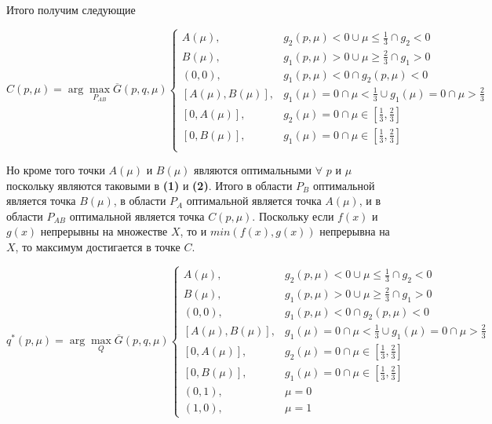 \begin{flushleft}
	Итого получим следующие 

	$C(p,\mu) = \arg \max \limits_{P_{AB}} \overline{G}(p,q,\mu)
	\begin{cases}
	A(\mu), & g_2(p,\mu)<0 \cup \mu \leqslant \frac{1}{3} \cap g_2 < 0 \\
	B(\mu), & g_1(p,\mu)>0 \cup \mu \geqslant \frac{2}{3} \cap g_1 > 0 \\
	(0,0),  & g_1(p,\mu)<0 \cap g_2(p,\mu)<0 \\
	[A(\mu), B(\mu)], 
	& g_1(\mu)=0 \cap \mu < \frac{1}{3} \cup g_1(\mu)=0 \cap \mu > \frac{2}{3} \\
	[0, A(\mu)], & g_2(\mu)=0 \cap \mu \in [\frac{1}{3},\frac{2}{3}] \\
	[0, B(\mu)], & g_1(\mu)=0 \cap \mu \in [\frac{1}{3},\frac{2}{3}] \\
	\end{cases}	
	$	
	
	Но кроме того точки $A(\mu)$ и $B(\mu)$ являются оптимальными 
	$\forall$ $p$ и $\mu$ поскольку	являются таковыми в \textbf{(1)} и \textbf{(2)}.
	Итого в области $P_B$ оптимальной является точка $B(\mu)$,
	в области $P_A$ оптимальной является точка $A(\mu)$,
	и в области $P_{AB}$ оптимальной является точка $C(p, \mu)$.
	Поскольку если $f(x)$ и $g(x)$ непрерывны на множестве $X$, то и 
	$min(f(x), g(x))$ непрерывна на $X$, то максимум достигается в точке
	$C$.
	
	$q^*(p,\mu)= \arg \max \limits_Q \overline{G}(p,q,\mu)
	\begin{cases}
	A(\mu), & g_2(p,\mu)<0 \cup \mu \leqslant \frac{1}{3} \cap g_2 < 0 \\
	B(\mu), & g_1(p,\mu)>0 \cup \mu \geqslant \frac{2}{3} \cap g_1 > 0 \\
	(0,0),  & g_1(p,\mu)<0 \cap g_2(p,\mu)<0 \\
	[A(\mu), B(\mu)], 
	& g_1(\mu)=0 \cap \mu < \frac{1}{3} \cup g_1(\mu)=0 \cap \mu > \frac{2}{3} \\
	[0, A(\mu)], & g_2(\mu)=0 \cap \mu \in [\frac{1}{3},\frac{2}{3}] \\
	[0, B(\mu)], & g_1(\mu)=0 \cap \mu \in [\frac{1}{3},\frac{2}{3}] \\
	(0,1), & \mu = 0 \\
	(1,0), & \mu = 1
	\end{cases}	
	$		
	
	

	

\end{flushleft}
